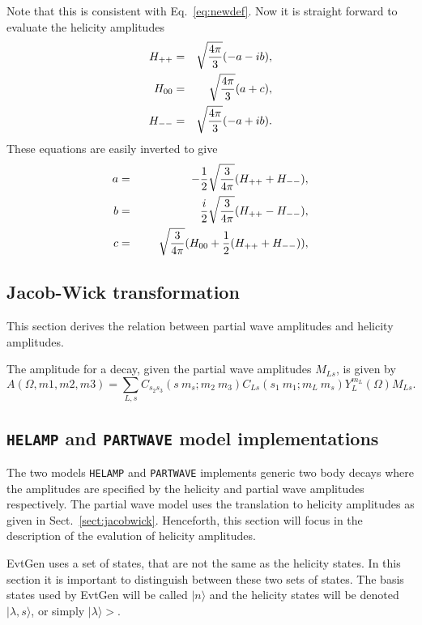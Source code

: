 Note that this is consistent with Eq.~\ref{eq:newdef}.
Now it is straight forward to evaluate the helicity amplitudes
\begin{eqnarray}
 H_{++} & = & \sqrt{4\pi\over 3}(-a-ib), \\
 H_{00} & = & \sqrt{4\pi\over 3}(a+c),\\
 H_{--} & = & \sqrt{4\pi\over 3}(-a+ib).
\end{eqnarray}
These equations are easily inverted to give
\begin{eqnarray}
 a & = & -{1\over2}\sqrt{3\over 4\pi}(H_{++}+H_{--}), \\
 b & = & \phantom{-}{i\over2}\sqrt{3\over 4\pi}(H_{++}-H_{--}), \\
 c & = & \phantom{-{1\over2}}\sqrt{3\over 4\pi}(H_{00}+{1\over 2}(H_{++}+H_{--})), \\
\end{eqnarray}


\subsection{Jacob-Wick transformation}
\label{sect:jacobwick}

This section derives the relation between partial wave amplitudes 
and helicity amplitudes. 

The amplitude for a decay, given the partial wave amplitudes $M_{Ls}$,
is given by
$$A(\Omega,m1,m2,m3)=\sum_{L,s}C_{s_2s_3}(s\ m_s;m_2\ m_3)
                               C_{Ls}(s_1\ m_1;m_L\ m_s)Y^{m_L}_L(\Omega)
                               M_{Ls}.$$


\subsection{{\tt HELAMP} and {\tt PARTWAVE} model implementations}

The two models {\tt HELAMP} and {\tt PARTWAVE} implements generic
two body decays where the amplitudes are specified by the
helicity and partial wave amplitudes respectively. The partial
wave model uses the translation to helicity amplitudes as given in
Sect.~\ref{sect:jacobwick}. Henceforth, this section will focus
in the description of the evalution of helicity amplitudes.

 EvtGen uses a set of states, that are not the same as the helicity
states. In this section it is important to distinguish between these two
sets of states. The basis states used by EvtGen will be called
$|n\rangle$ and the helicity states will be denoted $|\lambda, s\rangle$,
or simply $|\lambda\rangle>$. 

